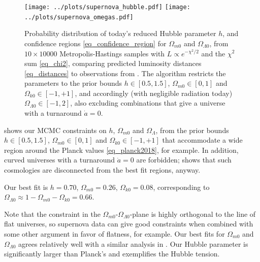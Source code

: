 \documentclass[10pt,a4paper]{article}
\begin{document}
\begin{figure}[bh!]
	\centering
	\texttt{[image: ../plots/supernova\_hubble.pdf]}
	\texttt{[image: ../plots/supernova\_omegas.pdf]}
	\caption{%
		Probability distribution of today's reduced Hubble parameter $h$,
		and confidence regions \eqref{eq_confidence_region} for $\Omega_{m0}$ and $\Omega_{\Lambda0}$,
		from $10 \times 10000$ Metropolis-Hastings samples with $L \propto e^{-\chi^2/2}$ and the $\chi^2$ sum \eqref{eq_chi2},
		comparing predicted luminosity distances \eqref{eq_distances} to observations from \cite{betouleImprovedCosmologicalConstraints2014}.
		The algorithm restricts the parameters to the prior bounds $h \in [0.5, 1.5]$, $\Omega_{m0} \in [0, 1]$ and $\Omega_{k0} \in [-1, +1]$,
		and accordingly (with negligible radiation today) $\Omega_{\Lambda0} \in [-1, 2]$,
		also excluding combinations that give a universe with a turnaround $\dot{a}=0$.
	}
	\label{fig_supernova_mcmc}
\end{figure}

 shows our MCMC constraints on $h$, $\Omega_{m0}$ and $\Omega_\Lambda$,
from the prior bounds $h \in [0.5, 1.5]$, $\Omega_{m0} \in [0, 1]$ and $\Omega_{k0} \in [-1, +1]$
that accommodate a wide region around the Planck values \eqref{eq_planck2018}, for example.
In addition, curved universes with a turnaround $\dot{a} = 0$ are forbidden;
\cite[Figure 11]{amanullahSpectraLightCurves2010} shows that such cosmologies are disconnected from the best fit regions, anyway.

Our best fit is $h = 0.70$, $\Omega_{m0} = 0.26$, $\Omega_{k0} = 0.08$,
corresponding to $\Omega_{\Lambda 0} \approx 1 - \Omega_{m0} - \Omega_{k0} = 0.66$.

Note that the constraint in the $\Omega_{m0}$-$\Omega_{\Lambda0}$-plane is highly orthogonal to the line of flat universes,
so supernova data can give good constraints when combined with some other argument in favor of flatness, for example.
Our best fits for $\Omega_{m0}$ and $\Omega_{\Lambda0}$ agrees relatively well with a similar analysis in \cite[Fig. 15]{betouleImprovedCosmologicalConstraints2014}.
Our Hubble parameter is significantly larger than Planck's and exemplifies the Hubble tension.

\clearpage

%
\printbibliography
\end{document}
